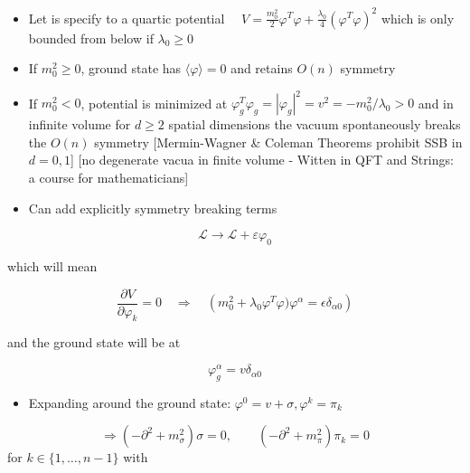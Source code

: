 \begin{itemize}
  \item Let is specify to a quartic potential \(\quad V=\frac{m_0^{2}}{2} \varphi^{T} \varphi+\frac{\lambda_0}{4}\left(\varphi^{T} \varphi\right)^{2}\) which is only bounded from below if \(\lambda_{0} \geqslant 0\)
  \item If \(m_{0}^{2} \geqslant 0\), ground state has \(\langle\varphi\rangle=0\) and retains \(O(n)\) symmetry
  \item If \(m_{0}^{2}<0\), potential is minimized at \(\varphi_{g}^{T} \varphi_{g}=\left|\varphi_{g}\right|^{2}=v^{2}=-m_{0}^{2} / \lambda_{0}>0\) and in infinite volume for $d \geq 2$ spatial dimensions the vacuum spontaneously breaks the $O(n)$ symmetry [Mermin-Wagner \& Coleman Theorems prohibit SSB in $d=0,1$] [no degenerate vacua in finite volume - Witten in QFT and Strings: a course for mathematicians]

  \item Can add explicitly symmetry breaking terms
\end{itemize}

\begin{equation}
\mathcal{L} \rightarrow \mathcal{L}+\varepsilon \varphi_{0}
\end{equation}

which will mean

\begin{equation}
\frac{\partial V}{\partial \varphi_{k}}=0 \quad \Rightarrow \quad\left(m_0^2 + \lambda_0 \varphi^T \varphi) \varphi^\alpha = \epsilon \delta_{\alpha 0}\right)
\end{equation}

and the ground state will be at

\begin{equation}
\varphi_{g}^{\alpha}=v \delta_{\alpha 0}
\end{equation}

\begin{itemize}
  \item Expanding around the ground state: \(\varphi^{0}=v+\sigma, \varphi^{k}=\pi_{k}\)
\end{itemize}

\begin{equation}
\Rightarrow\left(-\partial^{2}+m_{\sigma}^{2}\right) \sigma=0, \qquad\left(-\partial^{2}+m_{\pi}^{2}\right) \pi_{k}=0
\end{equation}
for $k\in\{1,\ldots,n-1\}$
with

